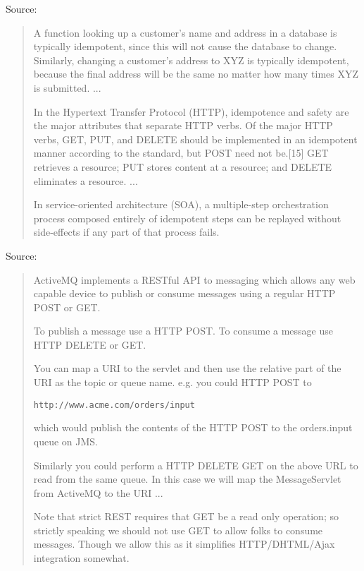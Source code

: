 \documentclass[Screen16to9,17pt]{foils}
\begin{document}
Source: {\footnotesize\\
}


\begin{quote}
A function looking up a customer's name and address in a database is typically idempotent, since this will not cause the database to change. Similarly, changing a customer's address to XYZ is typically idempotent, because the final address will be the same no matter how many times XYZ is submitted.
...

In the Hypertext Transfer Protocol (HTTP), idempotence and safety are the major attributes that separate HTTP verbs. Of the major HTTP verbs, GET, PUT, and DELETE should be implemented in an idempotent manner according to the standard, but POST need not be.[15] GET retrieves a resource; PUT stores content at a resource; and DELETE eliminates a resource.
...

In service-oriented architecture (SOA), a multiple-step orchestration process composed entirely of idempotent steps can be replayed without side-effects if any part of that process fails.
\end{quote}


Source: {\footnotesize\\
}





\begin{quote}
  ActiveMQ implements a RESTful API to messaging which allows any web capable device to publish or consume messages using a regular HTTP POST or GET.

  To publish a message use a HTTP POST. To consume a message use HTTP DELETE or GET.

  You can map a URI to the servlet and then use the relative part of the URI as the topic or queue name. e.g. you could HTTP POST to
\begin{alltt}
  http://www.acme.com/orders/input
\end{alltt}
  which would publish the contents of the HTTP POST to the orders.input queue on JMS.

  Similarly you could perform a HTTP DELETE GET on the above URL to read from the same queue. In this case we will map the MessageServlet from ActiveMQ to the URI
...

Note that strict REST requires that GET be a read only operation; so strictly speaking we should not use GET to allow folks to consume messages. Though we allow this as it simplifies HTTP/DHTML/Ajax integration somewhat.
\end{quote}
\end{document}
